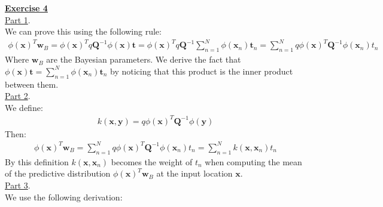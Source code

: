 \documentclass[a4paper, 11pt]{article}\usepackage[]{graphicx}\usepackage[]{color}
\begin{document}
\newpage
\textbf{\underline{Exercise 4}}\\
\newline \underline{Part 1}. \\
\newline We can prove this using the following rule:
\begin{eqnarray}
\phi (\mathbf{x})^T \mathbf{w}_B = \phi (\mathbf{x})^T q \mathbf{Q}^{-1} \phi (\mathbf{x}) \mathbf{t} = \phi (\mathbf{x})^T q \mathbf{Q}^{-1} \sum_{n = 1}^{N} \phi (\mathbf{x}_n) \mathbf{t}_n = \sum_{n=1}^{N} q \phi (\mathbf{x})^T \mathbf{Q}^{-1} \phi(\mathbf{x}_n) t_n  \nonumber
\end{eqnarray}
\newline Where $\mathbf{w}_B$ are the Bayesian parameters. We derive the fact that $\phi (\mathbf{x}) \mathbf{t} = \sum_{n = 1}^{N} \phi (\mathbf{x}_n) \mathbf{t}_n$ by noticing that this product is the inner product between them.\\
\newline \underline{Part 2}. \\
\newline We define:
\begin{eqnarray}
k(\mathbf{x}, \mathbf{y}) = q \phi (\mathbf{x})^T \mathbf{Q}^{-1} \phi (\mathbf{y}) \nonumber
\end{eqnarray}
Then:
\begin{eqnarray}
\phi (\mathbf{x})^T \mathbf{w}_B = \sum_{n=1}^{N} q \phi (\mathbf{x})^T \mathbf{Q}^{-1} \phi(\mathbf{x}_n) t_n = \sum_{n=1}^{N} k(\mathbf{x}, \mathbf{x}_n) t_n \nonumber
\end{eqnarray}
By this definition $k(\mathbf{x}, \mathbf{x}_n)$ becomes the weight of $t_n$ when computing the mean of the predictive distribution $\phi (\mathbf{x})^T \mathbf{w}_B$ at the input location $\mathbf{x}$.\\
\newline \underline{Part 3}. \\
\newline We use the following derivation:
\end{document}
